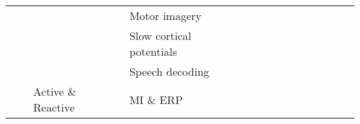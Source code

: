 \begin{tabular}{p{1.5cm}p{1.5cm}p{1.5cm}p{1.5cm}p{0.6cm}p{0.6cm}p{0.6cm}p{0.6cm}p{0.6cm}p{0.6cm}p{0.6cm}p{0.6cm}p{0.6cm}p{0.6cm}}
                                &                 &                   & Motor imagery &                                   \cite{Zhang2017a, Li2014} &  \cite{Gao2018, Sakhavi2017, Tang2017, Schirrmeister2017, Dharamsi2017, Loshchilov2017, Tabar2016a, Sakhavi2015, Yang2015a} &                                                      \cite{Zhang2018c} &                        \cite{An2014} &  \cite{Chiarelli2018, Major2017, Alomari2013, Mohamed2011} &                      &                       &  \cite{Zhang2017g, Normand2015} &                         &                                            \cite{Zhang2017d, Bu2010} \\
                                &                 &                   & Slow cortical potentials &                                                             &                                                                                                                             &                                                                        &                                      &                                                            &                      &                       &                 \cite{Ding2015} &                         &                                                                      \\
                                &                 &                   & Speech decoding &                                                             &                                                                                                                             &                                                                        &                      \cite{Sree2017} &                                                            &                      &                       &                                 &          \cite{Sun2016} &                                                                      \\
                                &                 & Active \& Reactive & MI \& ERP &                                                             &                                                                                                          \cite{Lawhern2018} &                                                                        &                                      &                                                            &                      &                       &                                 &                         &                                                                      \\

\end{tabular}
